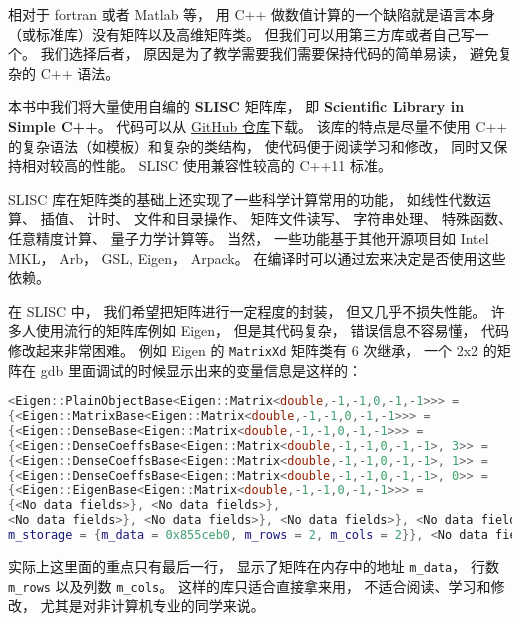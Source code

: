 

相对于 fortran 或者 Matlab 等， 用 C++ 做数值计算的一个缺陷就是语言本身（或标准库）没有矩阵以及高维矩阵类。 但我们可以用第三方库或者自己写一个。 我们选择后者， 原因是为了教学需要我们需要保持代码的简单易读， 避免复杂的 C++ 语法。

本书中我们将大量使用自编的 \textbf{SLISC} 矩阵库， 即 \textbf{Scientific Library in Simple C++}。 代码可以从 \href{https://github.com/MacroUniverse/SLISC0}{GitHub 仓库}下载。 该库的特点是尽量不使用 C++ 的复杂语法（如模板）和复杂的类结构， 使代码便于阅读学习和修改， 同时又保持相对较高的性能。 SLISC 使用兼容性较高的 C++11 标准。

SLISC 库在矩阵类的基础上还实现了一些科学计算常用的功能， 如线性代数运算、 插值、 计时、 文件和目录操作、 矩阵文件读写、 字符串处理、 特殊函数、 任意精度计算、 量子力学计算等。 当然， 一些功能基于其他开源项目如 Intel MKL， Arb， GSL, Eigen， Arpack。 在编译时可以通过宏来决定是否使用这些依赖。

在 SLISC 中， 我们希望把矩阵进行一定程度的封装， 但又几乎不损失性能。 许多人使用流行的矩阵库例如 Eigen， 但是其代码复杂， 错误信息不容易懂， 代码修改起来非常困难。 例如 Eigen 的 \verb|MatrixXd| 矩阵类有 6 次继承， 一个 2x2 的矩阵在 gdb 里面调试的时候显示出来的变量信息是这样的：
\begin{lstlisting}[language=cpp]
<Eigen::PlainObjectBase<Eigen::Matrix<double,-1,-1,0,-1,-1>>> = 
{<Eigen::MatrixBase<Eigen::Matrix<double,-1,-1,0,-1,-1>>> = 
{<Eigen::DenseBase<Eigen::Matrix<double,-1,-1,0,-1,-1>>> = 
{<Eigen::DenseCoeffsBase<Eigen::Matrix<double,-1,-1,0,-1,-1>, 3>> = 
{<Eigen::DenseCoeffsBase<Eigen::Matrix<double,-1,-1,0,-1,-1>, 1>> = 
{<Eigen::DenseCoeffsBase<Eigen::Matrix<double,-1,-1,0,-1,-1>, 0>> = 
{<Eigen::EigenBase<Eigen::Matrix<double,-1,-1,0,-1,-1>>> =
{<No data fields>}, <No data fields>}, 
<No data fields>}, <No data fields>}, <No data fields>}, <No data fields>},
m_storage = {m_data = 0x855ceb0, m_rows = 2, m_cols = 2}}, <No data fields>
\end{lstlisting}
实际上这里面的重点只有最后一行， 显示了矩阵在内存中的地址 \verb|m_data|， 行数 \verb|m_rows| 以及列数 \verb|m_cols|。 这样的库只适合直接拿来用， 不适合阅读、学习和修改， 尤其是对非计算机专业的同学来说。

